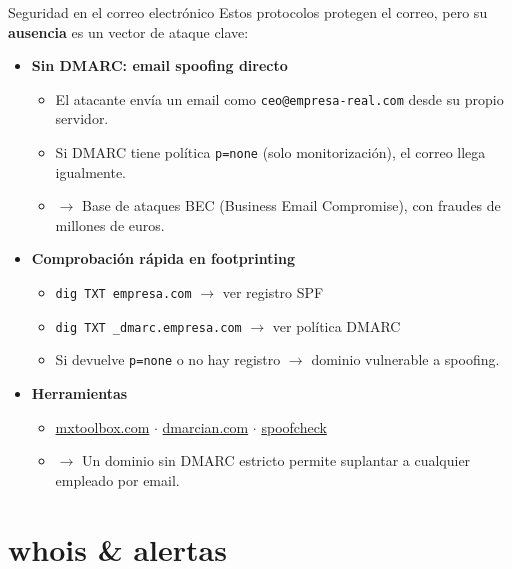 \documentclass[aspectratio=169,11pt]{beamer}
\newcommand{\cmd}[1]{\texttt{\color{uznavy}#1}}
\begin{document}
\begin{frame}[allowframebreaks]{Seguridad en el correo electrónico}
\small
Estos protocolos protegen el correo, pero su \textbf{ausencia} es un vector de ataque clave:
  \begin{itemize}
  \item \textbf{Sin DMARC: email spoofing directo}
    \begin{itemize}
    \item El atacante envía un email como \cmd{ceo@empresa-real.com} desde su propio servidor.
    \item Si DMARC tiene política \cmd{p=none} (solo monitorización), el correo llega igualmente.
    \item $\rightarrow$ Base de ataques BEC (Business Email Compromise), con fraudes de millones de euros.
    \end{itemize}
  \item \textbf{Comprobación rápida en footprinting}
    \begin{itemize}
    \item \cmd{dig TXT empresa.com} $\rightarrow$ ver registro SPF
    \item \cmd{dig TXT \_dmarc.empresa.com} $\rightarrow$ ver política DMARC
    \item Si devuelve \cmd{p=none} o no hay registro $\rightarrow$ dominio vulnerable a spoofing.
    \end{itemize}
  \item \textbf{Herramientas}
    \begin{itemize}
    \item \href{https://mxtoolbox.com}{mxtoolbox.com} $\cdot$ \href{https://dmarcian.com}{dmarcian.com} $\cdot$ \href{https://github.com/a6avind/spoofcheck}{spoofcheck}
    \item $\rightarrow$ Un dominio sin DMARC estricto permite suplantar a cualquier empleado por email.
    \end{itemize}
  \end{itemize}
\end{frame}

\section{whois \& alertas}
\end{document}
